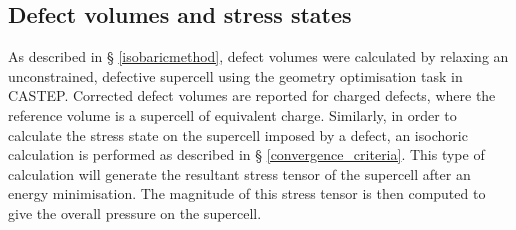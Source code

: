 %
%
%

\subsection{Defect volumes and stress states}

As described in § \ref{isobaricmethod}, defect volumes were calculated by relaxing an unconstrained, defective supercell using the geometry optimisation task in CASTEP. Corrected defect volumes are reported for charged defects, where the reference volume is a supercell of equivalent charge. Similarly, in order to calculate the stress state on the supercell imposed by a defect, an isochoric calculation is performed as described in § \ref{convergence_criteria}. This type of calculation will generate the resultant stress tensor of the supercell after an energy minimisation. The magnitude of this stress tensor is then computed to give the overall pressure on the supercell.

